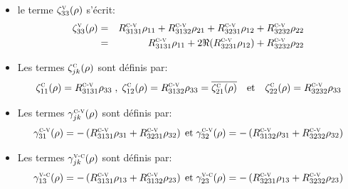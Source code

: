 \documentclass[12pt,a4paper,openany,oneside]{book}
\begin{document}
{{{{{{\begin{itemize}[label=$\bullet$]
\item le terme $\zeta^{\textsc{v}}_{33}(\rho) $ s'écrit:        
\begin{eqnarray*}
\zeta^{\textsc{v}}_{33}(\rho)  &=& R^{\textsc{c-v}}_{3131}\rho_{11}+R^{\textsc{c-v}}_{3132}\rho_{21}+R^{\textsc{c-v}}_{3231}\rho_{12}+R^{\textsc{c-v}}_{3232}\rho_{22}\\                                                                                                &=& R^{\textsc{c-v}}_{3131}\rho_{11}+2\Re(R^{\textsc{c-v}}_{3231}\rho_{12})+R^{\textsc{c-v}}_{3232}\rho_{22}                                                                                                  
\end{eqnarray*}
\item Les termes $ \zeta^{\textsc{c}}_{jk}(\rho) $ sont définis par:
$$ \zeta^{\textsc{c}}_{11}(\rho)= R^{\textsc{c-v}}_{3131}\rho_{33}\; ,\; \zeta^{\textsc{c}}_{12}(\rho) = R^{\textsc{c-v}}_{3132}\rho_{33}=\overline{\zeta^{\textsc{c}}_{21}(\rho)}\quad \mathrm{et} \quad\zeta^{\textsc{c}}_{22}(\rho) = R^{\textsc{c-v}}_{3232}\rho_{33} $$
\item Les termes $ \gamma^{\textsc{c-v}}_{jk}(\rho) $ sont définis par:
$$ \gamma^{\textsc{c-v}}_{31}(\rho)= -\left( R^{\textsc{c-v}}_{3131}\rho_{31}+ R^{\textsc{c-v}}_{3231}\rho_{32}\right)\;\mathrm{et}\; \gamma^{\textsc{c-v}}_{32}(\rho) = -\left( R^{\textsc{c-v}}_{3132}\rho_{31}+ R^{\textsc{c-v}}_{3232}\rho_{32}\right) $$
\item Les termes $ \gamma^{\textsc{v-c}}_{jk}(\rho) $ sont définis par:
$$ \gamma^{\textsc{v-c}}_{13}(\rho)= -\left( R^{\textsc{c-v}}_{3131}\rho_{13}+ R^{\textsc{c-v}}_{3132}\rho_{23}\right)\;\textrm{et} \; \gamma^{\textsc{v-c}}_{23}(\rho) = -\left( R^{\textsc{c-v}}_{3231}\rho_{13}+ R^{\textsc{c-v}}_{3232}\rho_{23}\right) $$


\end{itemize}}}}}}}
\end{document}
